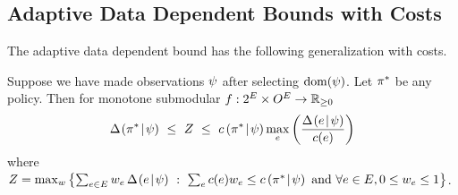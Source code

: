 %
\subsection{Adaptive Data Dependent Bounds with Costs} \label{sec:costs-data-dependent-bounds}  
%

The adaptive data dependent bound has the following generalization with costs.

\begin{lemma} \label{lem:rate-equation-with-costs}
Suppose we have made observations ${\color{black}{\ensuremath{\psi}}}$ \mbox{after}
selecting $\operatorname{dom}({\color{black}{\ensuremath{\psi}}})$.  Let $\pi^*$ be any policy.
Then for \term monotone submodular $f:2^{E} \times
O^{E} \to \mathbb{R}_{\ge 0}$ 
\begin{equation}
  \label{eq:data-dependent-bound-adaptive-with-costs}
\diff{\prlz}{\policy^*} \ \le \ Z \ \le \  
\condcost{\prlz}{\policy^*} \max_{e} \paren{\frac{\diff{\prlz}{e}}{c(e)}}
%
%
%
\end{equation}
where $Z = \max_w \left\{ \sum_{e \in E} w_e \,\Delta \hspace{-0.3mm} \left( { {e}\! \mid \! {{\color{black}{\ensuremath{\psi}}}} } \right)   \ :
  \ \sum_e
  c(e) w_e \le c \left( { {\pi^*} \! \mid \! {{\color{black}{\ensuremath{\psi}}}} } \right)   \text{ and } \forall e \in E, 0 \le w_e \le 1
\right\}$.  
%
%
%
\end{lemma}

%
%
%

%



